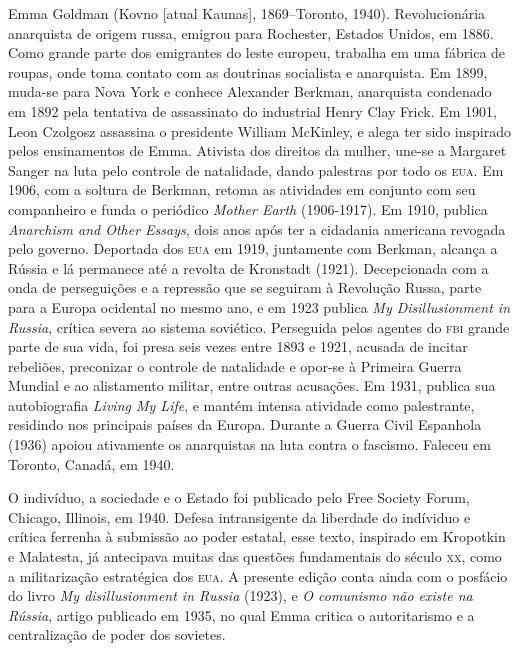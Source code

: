 \begin{resumopage} 


\item[Emma Goldman] (Kovno [atual Kaunas], 1869--Toronto,
1940). Revolucionária anarquista de origem russa, emigrou para Rochester,
Estados Unidos, em 1886.  Como grande parte dos emigrantes do leste europeu,
trabalha em uma fábrica de roupas, onde toma contato com as doutrinas socialista
e anarquista. Em 1899, muda-se para Nova York e conhece Alexander Berkman,
anarquista condenado em 1892 pela tentativa de assassinato do industrial Henry
Clay Frick. Em 1901, Leon Czolgosz assassina o presidente William McKinley, e
alega ter sido inspirado pelos ensinamentos de Emma. Ativista dos direitos da
mulher, une-se a Margaret Sanger na luta pelo controle de natalidade, dando
palestras por todo os \textsc{eua}. Em 1906, com a soltura de Berkman, retoma as
atividades em conjunto com seu companheiro e funda o periódico \textit{Mother
Earth} (1906-1917). Em 1910, publica  \textit{Anarchism and Other Essays}, dois
anos após ter a cidadania americana revogada pelo governo.  Deportada dos
\textsc{eua} em 1919, juntamente com Berkman, alcança a Rússia e lá permanece
até a revolta de Kronstadt (1921). Decepcionada com a onda de perseguições e a
repressão que se seguiram à Revolução Russa, parte para a Europa ocidental no
mesmo ano, e em 1923 publica \textit{My Disillusionment in Russia}, crítica
severa ao sistema soviético. Perseguida pelos agentes do \textsc{fbi} grande
parte de sua vida, foi presa seis vezes entre 1893 e 1921, acusada de incitar
rebeliões, preconizar o controle de natalidade e opor-se à Primeira Guerra
Mundial e ao alistamento militar, entre outras acusações. Em 1931, publica sua
autobiografia \textit{Living My Life}, e mantém intensa atividade como
palestrante, residindo nos principais países da Europa. Durante a Guerra Civil
Espanhola (1936) apoiou ativamente os anarquistas na luta contra o fascismo.
Faleceu em Toronto, Canadá, em 1940.  

\item[O indivíduo, a sociedade e o Estado] foi publicado pelo Free Society
Forum, Chicago, Illinois, em 1940. Defesa intransigente da liberdade do
indíviduo e crítica ferrenha à submissão ao poder estatal, esse texto, inspirado
em Kropotkin e Malatesta, já antecipava muitas das questões fundamentais do
século \textsc{xx}, como a militarização estratégica dos \textsc{eua}. A
presente edição conta ainda com o posfácio do livro \textit{My disillusionment
in Russia} (1923), e \textit{O comunismo não existe na Rússia}, artigo publicado
em 1935, no qual Emma critica o autoritarismo e a centralização de poder dos
sovietes.  


\end{resumopage}
